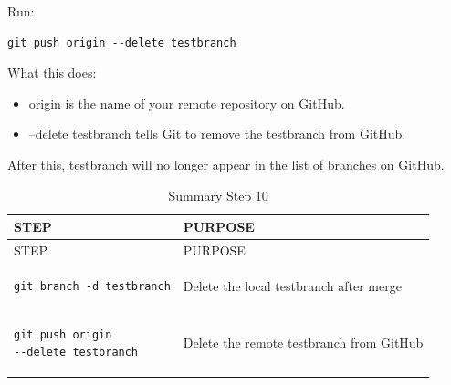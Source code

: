 \documentclass[
  11pt,
  a4paper,
]{article}
\begin{document}
Run:

\begin{verbatim}
git push origin --delete testbranch 
\end{verbatim}

What this does:

\begin{itemize}
\item
  origin is the name of your remote repository on GitHub.
\item
  --delete testbranch tells Git to remove the testbranch from GitHub.
\end{itemize}

After this, testbranch will no longer appear in the list of branches on
GitHub.

\begin{longtable}[]{@{}
  >{\raggedright\arraybackslash}p{}
  >{\raggedright\arraybackslash}p{}@{}}
\caption{Summary Step 10}\tabularnewline
\toprule\noalign{}
\begin{minipage}[b]{\linewidth}\raggedright
STEP
\end{minipage} & \begin{minipage}[b]{\linewidth}\raggedright
PURPOSE
\end{minipage} \\
\midrule\noalign{}
\endfirsthead
\toprule\noalign{}
\begin{minipage}[b]{\linewidth}\raggedright
STEP
\end{minipage} & \begin{minipage}[b]{\linewidth}\raggedright
PURPOSE
\end{minipage} \\
\midrule\noalign{}
\endhead
\bottomrule\noalign{}
\endlastfoot
\begin{minipage}[t]{\linewidth}\raggedright
\begin{verbatim}
git branch -d testbranch
\end{verbatim}
\end{minipage} & Delete the local testbranch after merge \\
\begin{minipage}[t]{\linewidth}\raggedright
\begin{verbatim}
git push origin
--delete testbranch
\end{verbatim}
\end{minipage} & Delete the remote testbranch from GitHub \\
\end{longtable}
\end{document}
